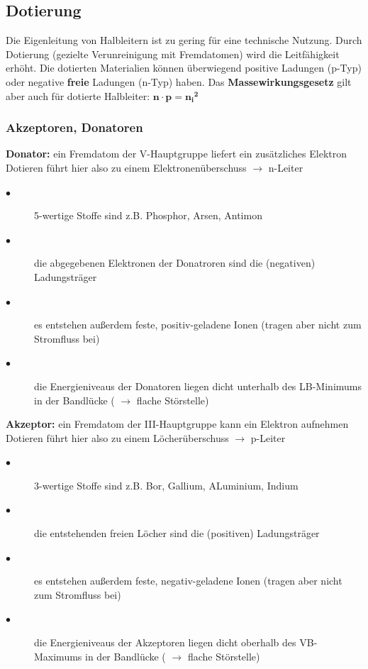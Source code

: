 \subsection{Dotierung}
	Die Eigenleitung von Halbleitern ist zu gering für eine technische Nutzung. Durch Dotierung (gezielte Verunreinigung mit Fremdatomen) wird die Leitfähigkeit erhöht. Die dotierten Materialien können überwiegend positive Ladungen (p-Typ) oder negative \textbf{freie} Ladungen (n-Typ) haben.
	Das \textbf{Massewirkungsgesetz} gilt aber auch für dotierte Halbleiter: $\mathbf{n \cdot{p} = {n_i}^2}$
	
	\subsubsection{Akzeptoren, Donatoren }
		\textbf{Donator:} ein Fremdatom der V-Hauptgruppe liefert ein zusätzliches Elektron
		Dotieren führt hier also zu einem Elektronenüberschuss $\rightarrow$ n-Leiter
		\begin{description}
			\item[$\bullet$] 5-wertige Stoffe sind z.B. Phosphor, Arsen, Antimon
			\item[$\bullet$] die abgegebenen Elektronen der Donatroren sind die (negativen) Ladungsträger
			\item[$\bullet$] es entstehen außerdem feste, positiv-geladene Ionen (tragen aber nicht zum Stromfluss bei)
			\item[$\bullet$] die Energieniveaus der Donatoren liegen dicht unterhalb des LB-Minimums in der Bandlücke ( $\rightarrow$ flache Störstelle)
		\end{description}
		
		\textbf{Akzeptor:} ein Fremdatom der III-Hauptgruppe kann ein Elektron aufnehmen
		Dotieren führt hier also zu einem Löcherüberschuss $\rightarrow$ p-Leiter
		\begin{description}
			\item[$\bullet$] 3-wertige Stoffe sind z.B. Bor, Gallium, ALuminium, Indium
			\item[$\bullet$] die entstehenden freien Löcher sind die (positiven) Ladungsträger
			\item[$\bullet$] es entstehen außerdem feste, negativ-geladene Ionen (tragen aber nicht zum Stromfluss bei)
			\item[$\bullet$] die Energieniveaus der Akzeptoren liegen dicht oberhalb des VB-Maximums in der Bandlücke ( $\rightarrow$ flache Störstelle)
		\end{description}
	

